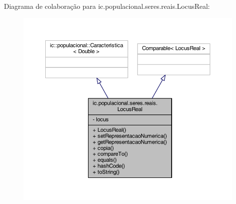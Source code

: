 Diagrama de colaboração para ic.\-populacional.\-seres.\-reais.\-Locus\-Real\-:
\nopagebreak
\begin{figure}[H]
\begin{center}
\leavevmode
\includegraphics[width=350pt]{classic_1_1populacional_1_1seres_1_1reais_1_1_locus_real__coll__graph}
\end{center}
\end{figure}
